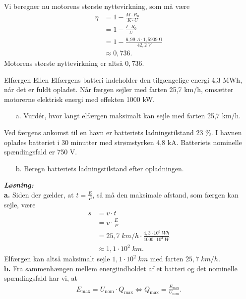 \documentclass{report}
\newcommand{\sol}{\setlength{\parindent}{0cm}\textbf{\textit{Løsning:}}\setlength{\parindent}{1cm}}
\begin{document}
Vi beregner nu motorens største nyttevirkning, som må være
\begin{equation*}
\begin{split}
  \eta &=1-\frac{M \cdot R_0}{K \cdot U}\\
  &=1- \frac{I \cdot R_0}{U}\\
  &=1-\frac{6,99 \;\unit{A} \cdot 1,5909 \;\unit{\ohm} }{42,2 \;\unit{V}}\\
  &\approx 0,736.
\end{split}
\end{equation*}
Motorens største nyttevirkning er altså $0,736$.

\begin{question}{Elfærgen Ellen}{}
  Elfærgens batteri indeholder den tilgængelige energi 4,3 MWh, når det er fuldt opladet.
  Når færgen sejler med farten 25,7 km/h, omsætter motorerne elektrisk energi med effekten 1000 kW.
  \begin{itemize}
    \item[a.] Vurdér, hvor langt elfærgen maksimalt kan sejle med farten 25,7 km/h.
  \end{itemize}
  Ved færgens ankomst til en havn er batteriets ladningstilstand 23 \%.
I havnen oplades batteriet i 30 minutter med strømstyrken 4,8 kA.
Batteriets nominelle spændingsfald er 750 V.
\begin{itemize}
  \item[b.] Beregn batteriets ladningstilstand efter opladningen.
\end{itemize}
\end{question}
\sol \\
\textbf{a.}
Siden der gælder, at $t=\frac{E}{P}$, så må den maksimale afstand, som færgen kan sejle, være
\begin{equation*}
\begin{split}
  s&=v \cdot t \\
  &=v \cdot \frac{E}{P}\\
  &=25,7 \;\unit{km/h} \cdot \frac{4,3 \cdot 10^6\;\unit{Wh}}{1000 \cdot 10^3 \;\unit{W}}\\
  &\approx 1,1 \cdot 10^2 \;\unit{km}.
\end{split}
\end{equation*}
Elfærgen kan altså maksimalt sejle $1,1 \cdot 10^2 \;\unit{km} $ med farten $25,7 \;\unit{km/h} $. \\[1ex]
\textbf{b.}
Fra sammenhængen mellem energiindholdet af et batteri og det nominelle spændingsfald har vi, at
\begin{equation*}
\begin{split}
  E _{\text{max} }=U _{\text{nom} } \cdot Q _{\text{max} } \iff Q _{\text{max} }=\frac{E _{\text{max} }}{U _{\text{nom} }}.
\end{split}
\end{equation*}
\end{document}
